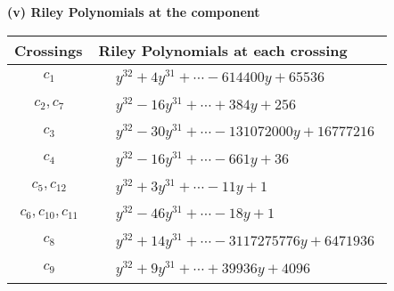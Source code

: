 \documentclass[1p]{elsarticle_modified}
\theoremstyle{definition}
\begin{document}
\newpage\renewcommand{\arraystretch}{1}
\flushleft \textbf{(v) Riley Polynomials at the component}\newline \\
\begin{tabular}{m{50pt}|m{274pt}}
Crossings & \hspace{64pt}Riley Polynomials at each crossing \\
\hline $$\begin{aligned}c_{1}\end{aligned}$$&$\begin{aligned}
&y^{32}+4 y^{31}+\cdots-614400 y+65536
\end{aligned}$\\
\hline $$\begin{aligned}c_{2},c_{7}\end{aligned}$$&$\begin{aligned}
&y^{32}-16 y^{31}+\cdots+384 y+256
\end{aligned}$\\
\hline $$\begin{aligned}c_{3}\end{aligned}$$&$\begin{aligned}
&y^{32}-30 y^{31}+\cdots-131072000 y+16777216
\end{aligned}$\\
\hline $$\begin{aligned}c_{4}\end{aligned}$$&$\begin{aligned}
&y^{32}-16 y^{31}+\cdots-661 y+36
\end{aligned}$\\
\hline $$\begin{aligned}c_{5},c_{12}\end{aligned}$$&$\begin{aligned}
&y^{32}+3 y^{31}+\cdots-11 y+1
\end{aligned}$\\
\hline $$\begin{aligned}c_{6},c_{10},c_{11}\end{aligned}$$&$\begin{aligned}
&y^{32}-46 y^{31}+\cdots-18 y+1
\end{aligned}$\\
\hline $$\begin{aligned}c_{8}\end{aligned}$$&$\begin{aligned}
&y^{32}+14 y^{31}+\cdots-3117275776 y+6471936
\end{aligned}$\\
\hline $$\begin{aligned}c_{9}\end{aligned}$$&$\begin{aligned}
&y^{32}+9 y^{31}+\cdots+39936 y+4096
\end{aligned}$\\
\hline
\end{tabular}\\~\\
\end{document}
